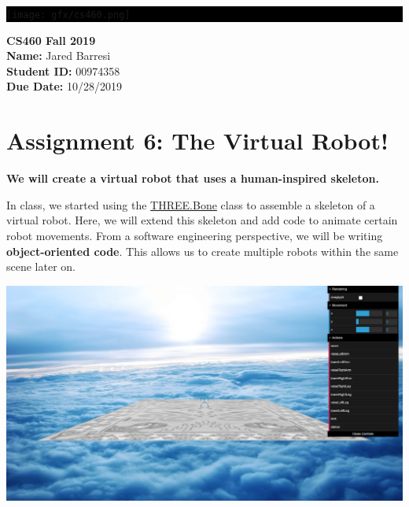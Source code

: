\documentclass[10pt,oneside,onecolumn,letterpaper]{article}
\begin{document}
\noindent\colorbox{black}{
\begin{minipage}[c]{.99\linewidth}
  \vspace{.4cm}
  \Large{}
  \begin{flushright}
    \vspace{-1.2cm}
    \texttt{[image: gfx/cs460.png]}
  \end{flushright}
\end{minipage}
}


\vspace{.5cm} %

\noindent\textbf{CS460 Fall 2019} \\
\textbf{Name:} Jared Barresi \\
\textbf{Student ID:} 00974358 \\
\textbf{Due Date:} 10/28/2019

\section*{Assignment 6: The Virtual Robot!}

\textbf{We will create a virtual robot that uses a human-inspired skeleton.}

\vspace{.5cm} %

\noindent In class, we started using the \url{THREE.Bone} class to assemble a skeleton of a virtual robot. Here, we will extend this skeleton and add code to animate certain robot movements. From a software engineering perspective, we will be writing \textbf{object-oriented code}. This allows us to create multiple robots within the same scene later on.

\vspace{.5cm}

\begin{center}
\includegraphics[width=.7\textwidth]{gfx/screenshot-1.png}
\end{center}
\end{document}
